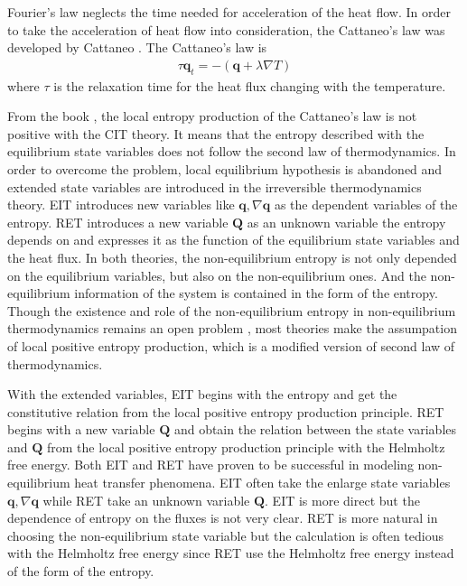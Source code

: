 \documentclass[a4paper]{article}
\begin{document}
 Fourier's law neglects the time needed for acceleration of the heat flow. In order to take the acceleration of heat flow into consideration, the Cattaneo's law was developed by Cattaneo \cite{cattaneo2011sulla}. The Cattaneo's law is 
\begin{eqnarray}
\tau \mathbf{q}_t = -(\mathbf{q}+\lambda \nabla T)
\end{eqnarray}
where $\tau$ is the relaxation time for the heat flux changing with the temperature.

From the book \cite{Jou1996extended}, the local entropy production of the Cattaneo's law is not positive with the CIT theory. It means that the entropy described with the equilibrium state variables does not follow the second law of thermodynamics. In order to overcome the problem, local equilibrium hypothesis is abandoned and extended state variables are introduced in the irreversible thermodynamics theory. EIT introduces new variables like $\mathbf{q},\nabla \mathbf{q}$ as the dependent variables of the entropy. RET introduces a new variable $\mathbf{Q}$ as an unknown variable the entropy depends on and expresses it as the function of the equilibrium state variables and the heat flux. In both theories, the non-equilibrium entropy is not only depended on the equilibrium variables, but also on the non-equilibrium ones. And the non-equilibrium information of the system is contained in the form of the entropy. Though the existence and role of the non-equilibrium entropy in non-equilibrium thermodynamics remains an open problem \cite{sellitto2013entropy}, most theories make the assumpation of local positive entropy production, which is a modified version of second law of thermodynamics.
 
With the extended variables, EIT begins with the entropy and get the constitutive relation from the local positive entropy production principle. RET begins with a new variable $\mathbf{Q}$ and obtain the relation between the state variables and $\mathbf{Q}$ from the local positive entropy production principle with the Helmholtz free energy. Both EIT and RET have proven to be successful in modeling non-equilibrium heat transfer phenomena. EIT often take the enlarge state variables $\mathbf{q},{\nabla \mathbf{q}}$ while RET take an unknown variable $\mathbf{Q}$. EIT is more direct but the dependence of entropy on the fluxes is not very clear. RET is more natural in choosing the non-equilibrium state variable but the calculation is often tedious with the Helmholtz free energy since RET use the Helmholtz free energy instead of the form of the entropy.
\end{document}
